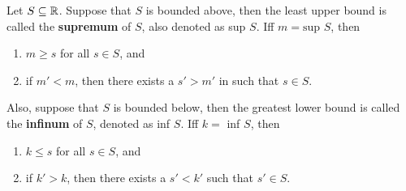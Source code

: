 \begin{definition}
	Let $S\subseteq \mathbb{R}$. Suppose that $S$ is bounded above, then the least upper bound is called the \textbf{supremum} of $S$, also denoted as sup $S$. Iff $m=\text{sup }S$, then
	\begin{enumerate}
		\item $m\geq s$ for all $s\in S$, and
		\item if $m'<m$, then there exists a $s'>m'$ in such that $s\in S$.
	\end{enumerate}
	Also, suppose that $S$ is bounded below, then the greatest lower bound is called the \textbf{infinum} of $S$, denoted as inf $S$. Iff $k=$ inf $S$, then
	\begin{enumerate}
		\item $k\leq s$ for all $s\in S$, and
		\item if $k'>k$, then there exists a $s'<k'$ such that $s'\in S$.
	\end{enumerate}
\end{definition}










































































